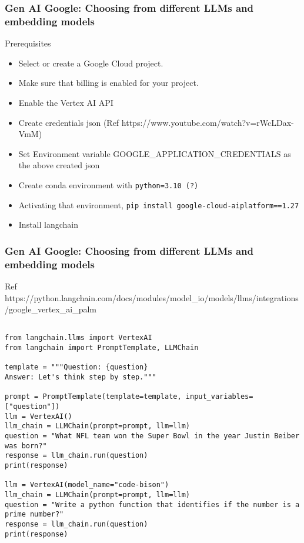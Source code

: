 \begin{frame}[fragile]\frametitle{Gen AI Google: Choosing from different LLMs and embedding models}

Prerequisites
\begin{itemize}
\item Select or create a Google Cloud project.
\item Make sure that billing is enabled for your project.
\item Enable the Vertex AI API
\item Create credentials json (Ref https://www.youtube.com/watch?v=rWcLDax-VmM)
\item Set Environment variable GOOGLE\_APPLICATION\_CREDENTIALS as the above created json
\item Create conda environment with \lstinline|python=3.10 (?)|
\item Activating that environment, \lstinline|pip install google-cloud-aiplatform==1.27|
\item Install langchain
\end{itemize}


\end{frame}


\begin{frame}[fragile]\frametitle{Gen AI Google: Choosing from different LLMs and embedding models}

Ref https://python.langchain.com/docs/modules/model\_io/models/llms/integrations/google\_vertex\_ai\_palm

\begin{lstlisting}

from langchain.llms import VertexAI
from langchain import PromptTemplate, LLMChain

template = """Question: {question}
Answer: Let's think step by step."""

prompt = PromptTemplate(template=template, input_variables=["question"])
llm = VertexAI()
llm_chain = LLMChain(prompt=prompt, llm=llm)
question = "What NFL team won the Super Bowl in the year Justin Beiber was born?"
response = llm_chain.run(question)
print(response)

llm = VertexAI(model_name="code-bison")
llm_chain = LLMChain(prompt=prompt, llm=llm)
question = "Write a python function that identifies if the number is a prime number?"
response = llm_chain.run(question)
print(response)
\end{lstlisting}


\end{frame}




